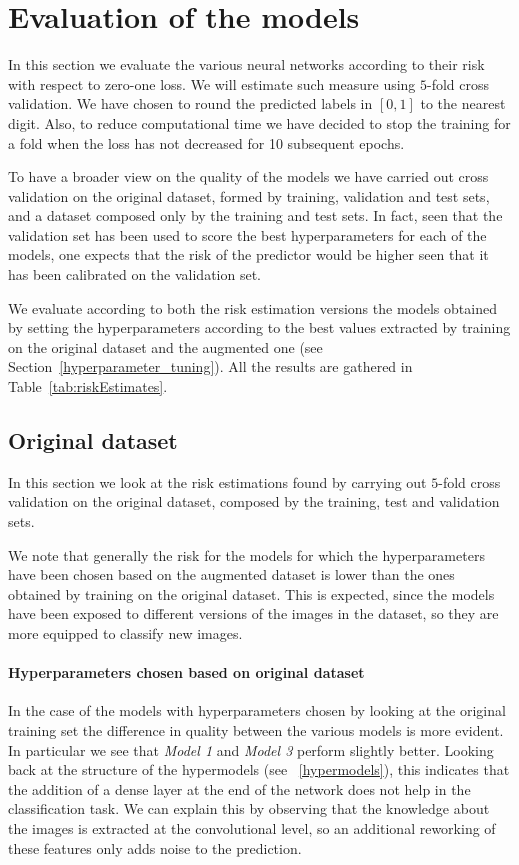 \section{Evaluation of the models}\label{3_evaluation}
In this section we evaluate the various neural networks according to their risk with respect to zero-one loss. We will estimate such measure using $5$-fold cross validation. We have chosen to round the predicted labels in $\left[0,1\right]$ to the nearest digit. Also, to reduce computational time we have decided to stop the training for a fold when the loss has not decreased for 10 subsequent epochs. 

To have a broader view on the quality of the models we have carried out cross validation on the original dataset, formed by training, validation and test sets, and a dataset composed only by the training and test sets. In fact, seen that the validation set has been used to score the best hyperparameters for each of the models, one expects that the risk of the predictor would be higher seen that it has been calibrated on the validation set. 

We evaluate according to both the risk estimation versions the models obtained by setting the hyperparameters according to the best values extracted by training on the original dataset and the augmented one (see Section~\ref{hyperparameter_tuning}). All the results are gathered in Table~\ref{tab:riskEstimates}.



\subsection{Original dataset}\label{evaluation_originalDataset}
In this section we look at the risk estimations found by carrying out $5$-fold cross validation on the original dataset, composed by the training, test and validation sets. 

We note that generally the risk for the models for which the hyperparameters have been chosen based on the augmented dataset is lower than the ones obtained by training on the original dataset. This is expected, since the models have been exposed to different versions of the images in the dataset, so they are more equipped to classify new images.

\paragraph{Hyperparameters chosen based on original dataset}
In the case of the models with hyperparameters chosen by looking at the original training set the difference in quality between the various models is more evident. In particular we see that \textsl{Model 1} and \textsl{Model 3} perform slightly better. Looking back at the structure of the hypermodels (see ~\ref{hypermodels}), this indicates that the addition of a dense layer at the end of the network does not help in the classification task. We can explain this by observing that the knowledge about the images is extracted at the convolutional level, so an additional reworking of these features only adds noise to the prediction.

